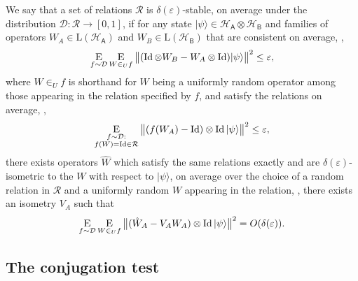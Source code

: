 \documentclass{toc}
\newcommand{\ket}[1]{|#1\rangle}
\newcommand{\Id}{\ensuremath{\mathop{\rm Id}\nolimits}}
\newcommand{\Es}[1]{\ensuremath{\mathop{\textsc{E}}}_{#1}} %
\newcommand{\setft}[1]{\mathrm{#1}}
\newcommand{\Lin}{\setft{L}}
\newcommand{\reg}[1]{{\textsf{#1}}}
\newcommand{\mH}{\mathcal{H}}
\newcommand{\eps}{\varepsilon}
\begin{document}
\begin{definition}
We say that a set of relations $\mathcal{R}$ is $\delta(\eps)$-stable, on average under the distribution $\mathcal{D}:\mathcal{R}\to[0,1]$, if for any state $\ket{\psi}\in\mH_\reg{A}\otimes \mH_\reg{B}$ and families of operators $W_A\in\Lin(\mH_\reg{A})$ and  $W_B\in\Lin(\mH_\reg{B})$ that are consistent on average, \ie, 
$$\Es{f \sim\mathcal{D}} \Es{W \in_U f} \big\| (\Id\otimes W_B - W_A \otimes \Id)\ket{\psi}\big\|^2\leq \eps,$$
where $W \in_U f$ is shorthand for $W$ being a uniformly random operator among those appearing in the relation specified by $f$,
and satisfy the relations on average, \ie, 
$$\Es{\substack{f\sim\mathcal{D}:\\f(W)=\Id \in\mathcal{R}}} \big\|  (f(W_A)- \Id) \otimes \Id \ket{\psi}\big\|^2 \leq \eps,$$
  there exists operators $\hat{W}$ which satisfy the same relations exactly and are $\delta(\eps)$-isometric to the $W$ with respect to $\ket{\psi}$, on average over the choice of a random relation in $\mathcal{R}$ and a uniformly random $W$ appearing in the relation, \ie, there exists an isometry $V_A$ such that 
  \begin{equation}
    \Es{f \sim\mathcal{D}} \Es{W \in_U f} \big\|( \hat{W}_A-V_A W_A)\otimes \Id \ket{\psi}\big\|^2=O(\delta(\eps)).\nonumber
  \end{equation}
	\end{definition}


\subsection{The conjugation test}
\label{sec:conj-test}
\end{document}
